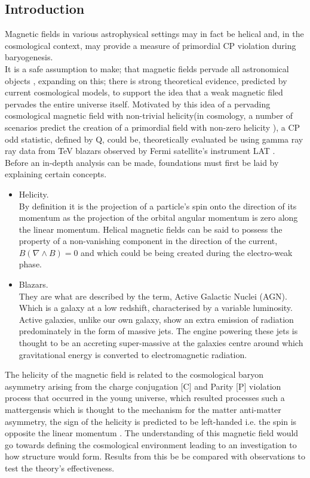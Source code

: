 \subsection {Introduction}

Magnetic fields in various astrophysical settings may in fact be helical and, in the cosmological context, may provide a measure of primordial CP violation during baryogenesis.\cite{2}\\
It is a safe assumption to make; that magnetic fields pervade all astronomical objects \cite{2} \cite{3}, expanding on this; there is strong theoretical evidence, predicted by current cosmological models, to support the idea that a weak magnetic filed pervades the entire universe itself. Motivated by this idea of a pervading cosmological magnetic field with non-trivial helicity(in cosmology, a number of scenarios predict the creation of a primordial field with non-zero helicity \cite{2}), a CP odd statistic, defined by Q, could be, theoretically evaluated be using gamma ray ray data from TeV blazars observed by Fermi satellite's instrument LAT \cite{9}. \\
Before an in-depth analysis can be made, foundations must first be laid by explaining certain concepts.
\begin{itemize}
\item {Helicity.} \\
By definition it is the projection of a particle's spin onto the direction of its momentum as the projection of the orbital angular momentum is zero along the linear momentum. \cite{4} Helical magnetic fields can be said to possess the property of a non-vanishing component in the direction of the current, $
B(\nabla \wedge B) = 0$ and which could be being created during the electro-weak phase. \cite{5}\cite{4}
\item {Blazars.} \\
They are what are described by the term, Active Galactic Nuclei (AGN). Which is a galaxy at a low redshift, characterised by a variable luminosity. Active galaxies, unlike our own galaxy, show an extra emission of radiation predominately in the form of massive jets. The engine powering these jets is thought to be an accreting super-massive at the galaxies centre around which gravitational energy is converted to electromagnetic radiation. \cite{9}
\end{itemize}
The helicity of the magnetic field is related to the cosmological baryon asymmetry arising from the charge conjugation [C] and Parity [P] violation process that occurred in the young universe, which resulted processes such a mattergensis which is thought to the mechanism for the matter anti-matter asymmetry, the sign of the helicity is predicted to be left-handed i.e. the spin is opposite the linear momentum \cite{2}. The understanding of this magnetic field would go towards defining the cosmological environment leading to an investigation to how structure would form. Results from this be be compared with observations to test the theory's effectiveness. 
